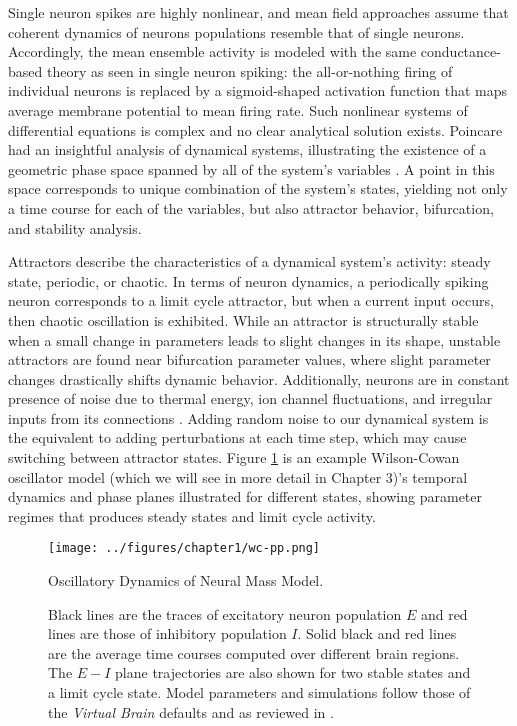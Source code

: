 Single neuron spikes are highly nonlinear, and mean field approaches assume that coherent dynamics of neurons populations resemble that of single neurons. Accordingly, the mean ensemble activity is modeled with the same conductance-based theory as seen in single neuron spiking: the all-or-nothing firing of individual neurons is replaced by a sigmoid-shaped activation function that maps average membrane potential to mean firing rate. Such nonlinear systems of differential equations is complex and no clear analytical solution exists. Poincare had an insightful analysis of dynamical systems, illustrating the existence of a geometric phase space spanned by all of the system's variables \cite{poincare1899methodes}. A point in this space corresponds to unique combination of the system's states, yielding not only a time course for each of the variables, but also attractor behavior, bifurcation, and stability analysis. 

Attractors describe the characteristics of a dynamical system's activity: steady state, periodic, or chaotic. In terms of neuron dynamics, a periodically spiking neuron corresponds to a limit cycle attractor, but when a current input occurs, then chaotic oscillation is exhibited. While an attractor is structurally stable when a small change in parameters leads to slight changes in its shape, unstable attractors are found near bifurcation parameter values, where slight parameter changes drastically shifts dynamic behavior. Additionally, neurons are in constant presence of noise due to thermal energy, ion channel fluctuations, and irregular inputs from its connections \cite{faisal2008noise,mivsic2010brain}. Adding random noise to our dynamical system is the equivalent to adding perturbations at each time step, which may cause switching between attractor states. Figure \ref{fig:wc-pp} is an example Wilson-Cowan oscillator model (which we will see in more detail in Chapter 3)'s temporal dynamics and phase planes illustrated for different states, showing parameter regimes that produces steady states and limit cycle activity. 

\begin{figure}[htbp]
	\centering
	\texttt{[image: ../figures/chapter1/wc-pp.png]}
	\caption{Oscillatory Dynamics of Neural Mass Model.}
	\caption*{Black lines are the traces of excitatory neuron population $E$ and red lines are those of inhibitory population $I$. Solid black and red lines are the average time courses computed over different brain regions. The $E-I$ plane trajectories are also shown for two stable states and a limit cycle state. Model parameters and simulations follow those of the \emph{Virtual Brain} defaults and as reviewed in \cite{sanz-leon_mathematical_2015}.}
	\label{fig:wc-pp}
\end{figure}

